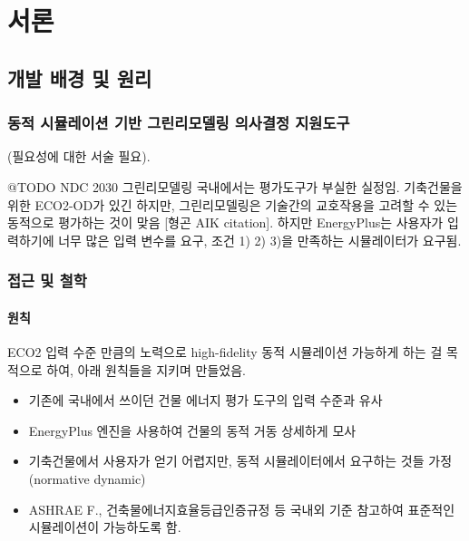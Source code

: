 \part{서론}
\label{part:introduction}


\chapter{개발 배경 및 원리}

\section{동적 시뮬레이션 기반 그린리모델링 의사결정 지원도구}
(필요성에 대한 서술 필요)\cite{van2018epb}.

@TODO 
NDC 2030 그린리모델링 국내에서는 평가도구가 부실한 실정임. 기축건물을 위한 ECO2-OD가 있긴 하지만, 그린리모델링은 기술간의 교호작용을 고려할 수 있는 동적으로 평가하는 것이 맞음 [형곤 AIK citation]. 하지만 EnergyPlus는 사용자가 입력하기에 너무 많은 입력 변수를 요구, 조건 1) 2) 3)을 만족하는 시뮬레이터가 요구됨.


\section{ 접근 및 철학}

\subsection{원칙}
ECO2 입력 수준 만큼의 노력으로 high-fidelity 동적 시뮬레이션 가능하게 하는 걸 목적으로 하여, 아래 원칙들을 지키며 만들었음.

\begin{itemize}
  \item 기존에 국내에서 쓰이던 건물 에너지 평가 도구의 입력 수준과 유사
  \item EnergyPlus 엔진을 사용하여 건물의 동적 거동 상세하게 모사
  \item 기축건물에서 사용자가 얻기 어렵지만, 동적 시뮬레이터에서 요구하는 것들 가정 (normative dynamic)
  \item ASHRAE F., 건축물에너지효율등급인증규정 등 국내외 기준 참고하여 표준적인 시뮬레이션이 가능하도록 함.
\end{itemize}

